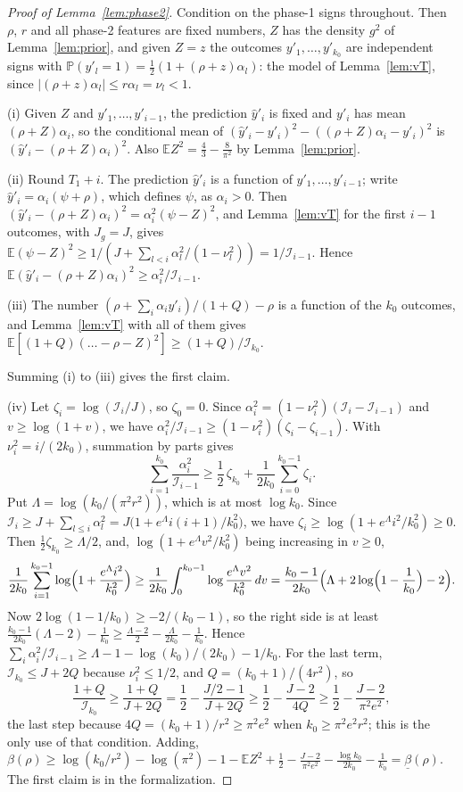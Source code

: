 \documentclass[12pt]{amsart}
\theoremstyle{definition}
\numberwithin{equation}{section}
\newcommand{\E}{\mathbb{E}}
\newcommand{\Prob}{\mathbb{P}}
\newcommand{\yh}{\hat y}
\newcommand{\Info}{\mathcal{I}}
\begin{document}
\begin{proof}[Proof of Lemma~\ref{lem:phase2}]
Condition on the phase-1 signs throughout. Then $\rho$, $r$ and all phase-2 features are fixed numbers, $Z$ has the density $g^2$ of Lemma~\ref{lem:prior}, and given $Z=z$ the outcomes $y'_1,\dots,y'_{k_0}$ are independent signs with $\Prob(y'_l=1)=\frac12(1+(\rho+z)\alpha_l)$: the model of Lemma~\ref{lem:vT}, since $|(\rho+z)\alpha_l|\le r\alpha_l=\nu_l<1$.

(i) Given $Z$ and $y'_1,\dots,y'_{i-1}$, the prediction $\yh'_i$ is fixed and $y'_i$ has mean $(\rho+Z)\alpha_i$, so the conditional mean of $(\yh'_i-y'_i)^2-((\rho+Z)\alpha_i-y'_i)^2$ is $(\yh'_i-(\rho+Z)\alpha_i)^2$. Also $\E Z^2=\frac43-\frac8{\pi^2}$ by Lemma~\ref{lem:prior}.

(ii) Round $T_1+i$. The prediction $\yh'_i$ is a function of $y'_1,\dots,y'_{i-1}$; write $\yh'_i=\alpha_i(\psi+\rho)$, which defines $\psi$, as $\alpha_i>0$. Then $(\yh'_i-(\rho+Z)\alpha_i)^2=\alpha_i^2(\psi-Z)^2$, and Lemma~\ref{lem:vT} for the first $i-1$ outcomes, with $J_g=J$, gives $\E(\psi-Z)^2\ge1/(J+\sum_{l<i}\alpha_l^2/(1-\nu_l^2))=1/\Info_{i-1}$. Hence $\E(\yh'_i-(\rho+Z)\alpha_i)^2\ge\alpha_i^2/\Info_{i-1}$.

(iii) The number $(\rho+\sum_i\alpha_iy'_i)/(1+Q)-\rho$ is a function of the $k_0$ outcomes, and Lemma~\ref{lem:vT} with all of them gives $\E[(1+Q)(\dots-\rho-Z)^2]\ge(1+Q)/\Info_{k_0}$.

Summing (i) to (iii) gives the first claim.

(iv) Let $\zeta_i=\log(\Info_i/J)$, so $\zeta_0=0$. Since $\alpha_i^2=(1-\nu_i^2)(\Info_i-\Info_{i-1})$ and $v\ge\log(1+v)$, we have $\alpha_i^2/\Info_{i-1}\ge(1-\nu_i^2)(\zeta_i-\zeta_{i-1})$. With $\nu_i^2=i/(2k_0)$, summation by parts gives
\[
\sum_{i=1}^{k_0}\frac{\alpha_i^2}{\Info_{i-1}}\ge\frac12\,\zeta_{k_0}+\frac1{2k_0}\sum_{i=0}^{k_0-1}\zeta_i .
\]
Put $\Lambda=\log(k_0/(\pi^2r^2))$, which is at most $\log k_0$. Since $\Info_i\ge J+\sum_{l\le i}\alpha_l^2=J\bigl(1+e^\Lambda i(i+1)/k_0^2\bigr)$, we have $\zeta_i\ge\log(1+e^\Lambda i^2/k_0^2)\ge0$. Then $\frac12\zeta_{k_0}\ge\Lambda/2$, and, $\log(1+e^\Lambda v^2/k_0^2)$ being increasing in $v\ge0$,
\[
\frac1{2k_0}\sum_{i=1}^{k_0-1}\log\Bigl(1+\frac{e^\Lambda i^2}{k_0^2}\Bigr)\ge\frac1{2k_0}\int_0^{k_0-1}\log\frac{e^\Lambda v^2}{k_0^2}\,dv=\frac{k_0-1}{2k_0}\Bigl(\Lambda+2\log\Bigl(1-\frac1{k_0}\Bigr)-2\Bigr).
\]
Now $2\log(1-1/k_0)\ge-2/(k_0-1)$, so the right side is at least $\frac{k_0-1}{2k_0}(\Lambda-2)-\frac1{k_0}\ge\frac{\Lambda-2}2-\frac\Lambda{2k_0}-\frac1{k_0}$. Hence $\sum_i\alpha_i^2/\Info_{i-1}\ge\Lambda-1-\log(k_0)/(2k_0)-1/k_0$. For the last term, $\Info_{k_0}\le J+2Q$ because $\nu_i^2\le1/2$, and $Q=(k_0+1)/(4r^2)$, so
\[
\frac{1+Q}{\Info_{k_0}}\ge\frac{1+Q}{J+2Q}=\frac12-\frac{J/2-1}{J+2Q}\ge\frac12-\frac{J-2}{4Q}\ge\frac12-\frac{J-2}{\pi^2e^2},
\]
the last step because $4Q=(k_0+1)/r^2\ge\pi^2e^2$ when $k_0\ge\pi^2e^2r^2$; this is the only use of that condition. Adding, $\beta(\rho)\ge\log(k_0/r^2)-\log(\pi^2)-1-\E Z^2+\frac12-\frac{J-2}{\pi^2e^2}-\frac{\log k_0}{2k_0}-\frac1{k_0}=\underline\beta(\rho)$. The first claim is  in the formalization.
\end{proof}
\end{document}

